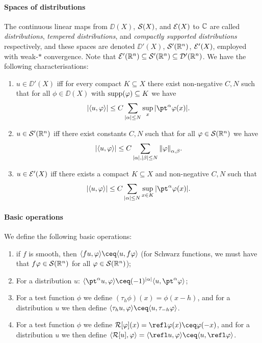 \paragraph{Spaces of distributions}
The continuous linear maps from $\DD(X)$, $\mathcal S(X)$, and $\mathcal E(X)$ to $\mathbb C$  are called \emph{distributions}, \emph{tempered distributions}, and \emph{compactly supported distributions} respectively, and these spaces are denoted $\DD'(X)$, $\mathcal S'(\mathbb R^n)$, $\mathcal E'(X)$, employed with weak-$*$ convergence. Note that $\mathcal E'(\mathbb R^n) \subseteq \mathcal S'(\mathbb R^n) \subseteq \mathcal D'(\mathbb R^n)$. We have the following characterisations:
\begin{enumerate}
	\item $u \in \DD'(X)$ iff for every compact $K \subseteq X$ there exist non-negative $C, N$ such that for all $\phi \in \DD(X)$ with $\operatorname{supp}(\varphi) \subseteq K$ we have 
	\[
	\abs{\ang{u, \phi}} \leq C \sum_{\abs{\alpha} \leq N} \sup_x \abs{\pt^\alpha\phi(x)}. 
	\]
	
	\item $u \in \mathcal S'(\mathbb R^n)$ iff there exist constants $C, N$ such that for all $\varphi \in \mathcal S(\mathbb R^n)$ we have
	\[
	\abs{\langle u, \varphi\rangle} \leq C \sum_{\abs{\alpha}, \abs{\beta} \leq N} \norm{\varphi}_{\alpha, \beta}. 
	\]
	
	\item $u \in \mathcal E'(X)$ iff there exists a compact $K\subseteq X$ and non-negative $C, N$ such that 
	\[
	\abs{\ang{u, \phi}} \leq C \sum_{\abs{\alpha} \leq N} \sup_{x \in K} \abs{\pt^\alpha \phi(x)}.
	\]
\end{enumerate}

\paragraph{Basic operations}
We define the following basic operations: 
\begin{enumerate}
	\itemsep=0em
	\item if $f$ is smooth, then $\ang{fu, \phi} \ceq \ang{u, f\phi}$ (for Schwarz functions, we must have that $f\varphi \in \mathcal S(\mathbb R^n)$ for all $\varphi \in \mathcal S(\mathbb R^n)$);
	\item For a distribution $u$: $\ang{\pt^\alpha u, \phi} \ceq (-1)^{\abs{\alpha}} \ang{u, \pt^\alpha\phi}$;
	\item For a test function $\phi$ we define $(\tau_h\phi)(x) = \phi(x - h)$, and for a distribution $u$ we then define $\ang{\tau_h u, \phi} \ceq \ang{u, \tau_{-h}\phi}$. 
	\item For a test function $\phi$ we define $\Rr[\phi](x) = \refl\phi(x) \ceq \phi(-x)$, and for a distribution $u$ we then define $\ang{\Rr[u], \phi} = \ang{\refl u, \phi} \ceq \ang{u, \refl\phi}$.
\end{enumerate}

